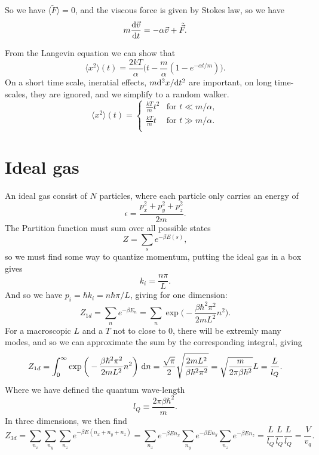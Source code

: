 \documentclass[a4paper, 11pt, notitlepage, english]{article}
\renewcommand{\d}{{\rm d}}
\newcommand{\eps}{\epsilon}
\begin{document}
So we have $\langle \tilde{F} \rangle = 0$, and the viscous force is given by Stokes law, so we have
$$m \frac{\d \vec{v}}{\d t} = -\alpha \vec{v} + \tilde{\vec{F}}.$$

From the Langevin equation we can show that
$$\langle x^2 \rangle(t) = \frac{2kT}{\alpha}\bigg(t - \frac{m}{\alpha}(1-e^{-\alpha t/m})\bigg).$$
On a short time scale, ineratial effects, $m\d^2 x / \d t^2$ are important, on long time-scales, they are ignored, and we simplify to a random walker.
$$\langle x^2 \rangle(t) = \begin{cases}
			\frac{kT}{m}t^2 & \mbox{for } t \ll m/\alpha, \\
			\frac{kT}{m}t & \mbox{for } t \gg m/\alpha. \\
\end{cases} $$
		


\clearpage

\section*{Ideal gas}
An ideal gas consist of $N$ particles, where each particle only carries an energy of
$$\eps = \frac{p_x^2 + p_y^2 + p_z^2}{2m}.$$
The Partition function must sum over all possible states
$$Z = \sum_s e^{-\beta E(s)},$$
so we must find some way to quantize momentum, putting the ideal gas in a box gives
$$k_i = \frac{n\pi}{L}.$$
And so we have $p_i = \hbar k_i = n\hbar \pi/L$, giving for one dimension:
$$Z_{1d} = \sum_n e^{-\beta E_n} = \sum_n \exp \bigg(-\frac{\beta \hbar^2 \pi^2}{2mL^2} n^2\bigg).$$
For a macroscopic $L$ and a $T$ not to close to 0, there will be extremly many modes, and so we can approximate the sum by the corresponding integral, giving
$$Z_{1d} = \int_0^\infty \exp \bigg(-\frac{\beta \hbar^2 \pi^2}{2mL^2} n^2\bigg) \ \d n = \frac{\sqrt{\pi}}{2} \sqrt{\frac{2mL^2}{\beta \hbar^2 \pi^2}} = \sqrt{\frac{m}{2\pi \beta \hbar^2}} L = \frac{L}{l_Q}.$$
Where we have defined the quantum wave-length
$$l_Q \equiv \frac{2\pi\beta\hbar^2}{m}.$$ 
In three dimensions, we then find
$$Z_{3d} = \sum_{n_x}\sum_{n_y}\sum_{n_z} e^{-\beta E(n_x + n_y + n_z)} = \sum_{n_x} e^{-\beta E n_x} \sum_{n_y} e^{-\beta E n_y} \sum_{n_z} e^{-\beta E n_z} = \frac{L}{l_Q}\frac{L}{l_Q}\frac{L}{l_Q} = \frac{V}{v_q}.$$
\end{document}
